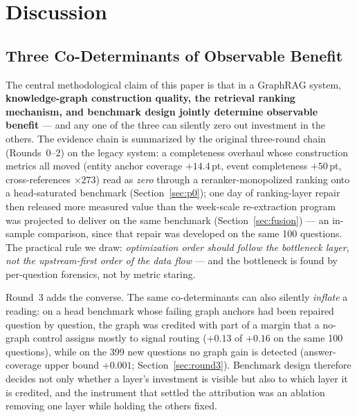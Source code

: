 
\section{Discussion}
\label{sec:discussion}

\subsection{Three Co-Determinants of Observable Benefit}

The central methodological claim of this paper is that in a GraphRAG
system, \textbf{knowledge-graph construction quality, the retrieval
ranking mechanism, and benchmark design jointly determine observable
benefit} --- and any one of the three can silently zero out investment
in the others. The evidence chain is summarized by the original
three-round chain (Rounds~0--2) on the legacy system: a completeness
overhaul whose construction metrics all moved (entity anchor coverage
$+14.4$\,pt, event completeness
$+50$\,pt, cross-references $\times 273$) read as \emph{zero} through a
reranker-monopolized ranking onto a head-saturated benchmark
(Section~\ref{sec:p0}); one day of ranking-layer repair then released
more measured value than the week-scale re-extraction program was
projected to deliver on the same benchmark (Section~\ref{sec:fusion})
--- an in-sample comparison, since that repair was developed on the
same 100 questions.
The practical rule we draw: \emph{optimization order should follow the
bottleneck layer, not the upstream-first order of the data flow} ---
and the bottleneck is found by per-question forensics, not by metric
staring.

Round~3 adds the converse. The same co-determinants can also silently
\emph{inflate} a reading: on a head benchmark whose failing graph
anchors had been repaired question by question, the graph was credited
with part of a margin that a no-graph control assigns mostly to signal
routing ($+0.13$ of $+0.16$ on the same 100 questions), while on the 399
new questions no graph gain is detected (answer-coverage upper bound
$+0.001$; Section~\ref{sec:round3}). Benchmark design
therefore decides not only whether a layer's investment is visible but
also to which layer it is credited, and the instrument that settled the
attribution was an ablation removing one layer while holding the others
fixed.

